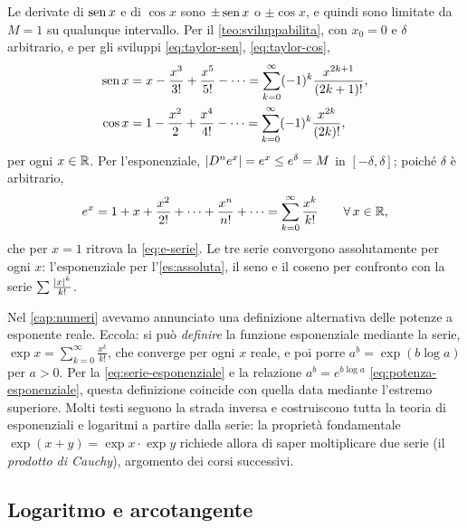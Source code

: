 \begin{esempio}\label{es:serie-elementari}
Le derivate di $\operatorname{sen} x$ e di $\cos x$ sono $\pm\operatorname{sen} x$ o $\pm\cos x$, e quindi sono limitate da
$M=1$ su qualunque intervallo. Per il \cref{teo:sviluppabilita}, con $x_{0}=0$ e $\delta$
arbitrario, e per gli sviluppi \eqref{eq:taylor-sen}, \eqref{eq:taylor-cos},
\begin{align}
  \operatorname{sen} x&=x-\frac{x^{3}}{3!}+\frac{x^{5}}{5!}-\dots=\sum_{k=0}^{\infty}(-1)^{k}\frac{x^{2k+1}}{(2k+1)!} , \label{eq:serie-seno}\\
  \cos x&=1-\frac{x^{2}}{2}+\frac{x^{4}}{4!}-\dots=\sum_{k=0}^{\infty}(-1)^{k}\frac{x^{2k}}{(2k)!} , \label{eq:serie-coseno}
\end{align}
per ogni $x\in\mathbb{R}$. Per l'esponenziale, $\lvert D^{n}e^{x}\rvert=e^{x}\le e^{\delta}=M$ in $[-\delta,\delta]$; poiché $\delta$
è arbitrario,
\begin{equation}\label{eq:serie-esponenziale}
  e^{x}=1+x+\frac{x^{2}}{2!}+\dots+\frac{x^{n}}{n!}+\dots=\sum_{k=0}^{\infty}\frac{x^{k}}{k!} \qquad\forall\, x\in\mathbb{R} ,
\end{equation}
che per $x=1$ ritrova la \eqref{eq:e-serie}. Le tre serie convergono assolutamente per ogni
$x$: l'esponenziale per l'\cref{es:assoluta}, il seno e il coseno per confronto con la
serie $\sum\frac{\lvert x\rvert^{k}}{k!}$.
\end{esempio}

\begin{osservazione}\label{oss:exp-serie}
Nel \cref{cap:numeri} avevamo annunciato una definizione alternativa delle potenze a
esponente reale. Eccola: si può \emph{definire} la funzione esponenziale mediante la
serie, $\exp x=\sum_{k=0}^{\infty}\frac{x^{k}}{k!}$, che converge per ogni $x$ reale, e poi porre
$a^{b}=\exp(b\log a)$ per $a>0$. Per la \eqref{eq:serie-esponenziale} e la relazione
$a^{b}=e^{b\log a}$ \eqref{eq:potenza-esponenziale}, questa definizione coincide con quella
data mediante l'estremo superiore. Molti testi seguono la strada inversa e costruiscono
tutta la teoria di esponenziali e logaritmi a partire dalla serie: la proprietà
fondamentale $\exp(x+y)=\exp x\cdot\exp y$ richiede allora di saper moltiplicare due serie
(il \emph{prodotto di Cauchy}), argomento dei corsi successivi.
\end{osservazione}

\subsection{Logaritmo e arcotangente}

